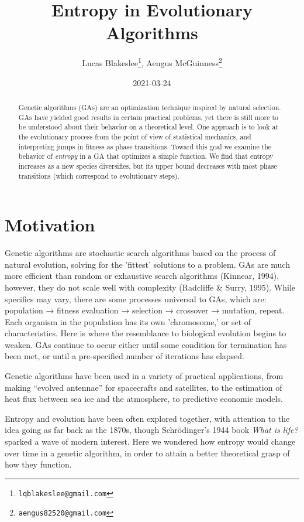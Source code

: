 \documentclass[11pt]{article}
\date{2021-03-24}
\title{Entropy in Evolutionary Algorithms}
\author{Lucas Blakeslee\footnote{\texttt{lqblakeslee@gmail.com}},
  Aengus McGuinness\footnote{\texttt{aengus82520@gmail.com}}}
\begin{document}
\maketitle

\label{sec:org26f53e0}
\begin{abstract}

Genetic algorithms (GAs) are an optimization technique inspired by
natural selection. GAs have yielded good results in certain practical
problems, yet there is still more to be understood about their
behavior on a theoretical level. One approach is to look at the
evolutionary process from the point of view of statistical mechanics,
and interpreting jumps in fitness as phase transitions. Toward this
goal we examine the behavior of \emph{entropy} in a GA that optimizes
a simple function.  We find that entropy increases as a new species
diversifies, but its upper bound decreases with most phase
transitions (which correspond to evolutionary steps).
\end{abstract}


\section{Motivation}

Genetic algorithms are stochastic search algorithms based on the
process of natural evolution, solving for the 'fittest' solutions to a
problem. GAs are much more efficient than random or exhaustive search
algorithms (Kinnear, 1994), however, they do not scale well with
complexity (Radcliffe \& Surry, 1995). While specifics may vary, there
are some processes universal to GAs, which are: population → fitness
evaluation → selection → crossover → mutation, repeat. Each organism
in the population has its own 'chromosome,' or set of
characteristics. Here is where the resemblance to biological evolution
begins to weaken. GAs continue to occur either until some condition
for termination has been met, or until a pre-specified number of
iterations has elapsed.

Genetic algorithms have been used in a variety of practical
applications, from making ``evolved antennae'' for spacecrafts and
satellites, to the estimation of heat flux between sea ice and the
atmosphere, to predictive economic models.

Entropy and evolution have been often explored together, with
attention to the idea going as far back as the 1870s, though
Schrödinger's 1944 book \emph{What is life?} sparked a wave of modern
interest. Here we wondered how entropy would change over time in a
genetic algorithm, in order to attain a better theoretical grasp of
how they function.
\end{document}
